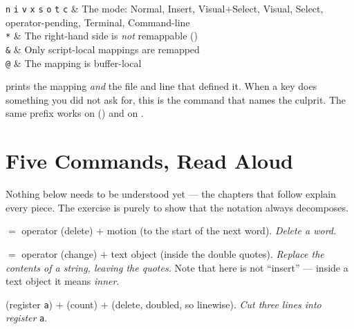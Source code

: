 \begin{keys}[0.22]
	\texttt{n} \texttt{i} \texttt{v} \texttt{x} \texttt{s} \texttt{o} \texttt{t} \texttt{c} & The mode: Normal, Insert, Visual+Select, Visual, Select, operator-pending, Terminal, Command-line \\
	\texttt{*}  & The right-hand side is \emph{not} remappable ()           \\
	\texttt{\&} & Only script-local mappings are remapped                                \\
	\texttt{@}  & The mapping is buffer-local                                            \\
\end{keys}

\begin{eg}
	 prints the mapping \emph{and} the file and line
	that defined it. When a key does something you did not ask for, this is the
	command that names the culprit. The same  prefix works on
	 () and on .
\end{eg}

\section{Five Commands, Read Aloud}\label{sec:vim-worked}

Nothing below needs to be understood yet --- the chapters that follow explain
every piece. The exercise is purely to show that the notation always decomposes.

\begin{eg}[1. \texttt{dw}]
	  $=$ operator  (delete) $+$ motion  (to the start
	of the next word). \emph{Delete a word.}
\end{eg}

\begin{eg}[2. \texttt{ci"}]
	   $=$ operator  (change) $+$ text object
	  (inside the double quotes). \emph{Replace the contents of a
		string, leaving the quotes.} Note that  here is not ``insert'' --- inside
	a text object it means \emph{inner}.
\end{eg}

\begin{eg}[3. \texttt{"a3dd}]
	  (register \texttt{a}) $+$  (count) $+$  
	(delete, doubled, so linewise). \emph{Cut three lines into register}
	\texttt{a}.
\end{eg}

